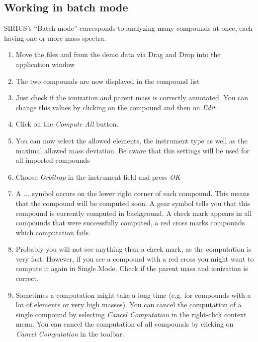 \documentclass[letterpaper,10pt,openany,oneside]{sphinxmanual}
\newcommand\gui[1]{\textsl{\guilsinglleft#1\guilsinglright\xspace}}
\begin{document}
\subsection{Working in batch mode}

SIRIUS's ``Batch mode'' corresponds to analyzing many compounds at once,
each having one or more mass spectra.

\begin{enumerate}
\item {} 
Move the files  and  from the demo data via Drag and Drop into the application window

\item {} 
The two compounds are now displayed in the compound list

\item {} 
Just check if the ionization and parent mass is correctly annotated. You can change this values by clicking on the compound and then on \gui{Edit}.

\item {} 
Click on the \gui{Compute All} button.

\item {} 
You can now select the allowed elements, the instrument type as well as the maximal allowed mass deviation. Be aware that this settings will be used for all imported compounds

\item {} 
Choose \gui{Orbitrap} in the instrument field and press \gui{OK}

\item {} 
A \gui{...} symbol occurs on the lower right corner of each compound. This 
means that the compound will be computed soon. A gear symbol tells you that 
this compound is currently computed in background. A check mark appears in 
all compounds that were successfully computed, a red cross marks compounds 
which computation fails.

\item {} 
Probably you will not see anything than a check mark, as the computation is very fast. However, if you see a compound with a red cross you might want to compute it again in Single Mode. Check if the parent mass and ionization is correct.

\item {} 
Sometimes a computation might take a long time (e.g. for compounds with a lot 
of elements or very high masses). You can cancel the computation of a single 
compound by selecting \gui{Cancel Computation} in the right-click context 
menu. You can cancel the computation of all compounds by clicking on 
\gui{Cancel Computation} in the toolbar.
\end{enumerate}
\end{document}

